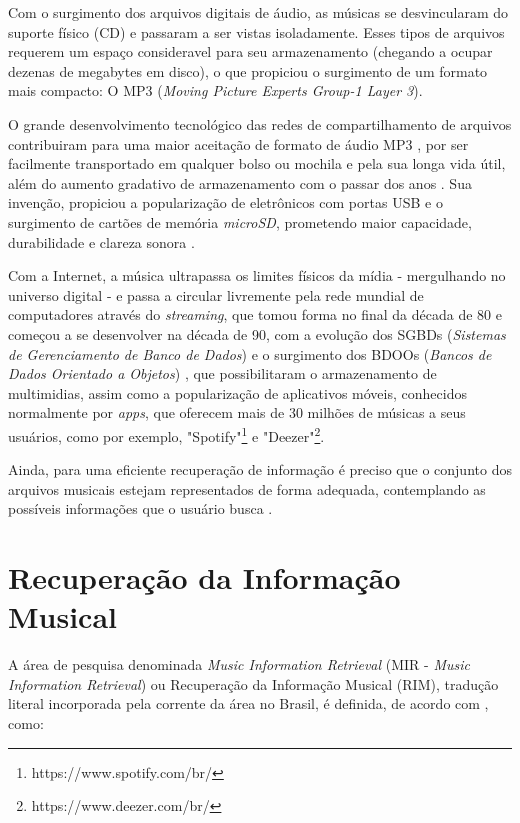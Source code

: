 Com o surgimento dos arquivos digitais de áudio, as músicas se desvincularam do suporte físico (CD) e passaram a ser vistas isoladamente. Esses tipos de arquivos requerem um espaço consideravel para seu armazenamento (chegando a ocupar dezenas de megabytes em disco), o que propiciou o surgimento de um formato mais compacto: O MP3 (\textit{Moving Picture Experts Group-1 Layer 3}).

O grande desenvolvimento tecnológico das redes de compartilhamento de arquivos contribuiram para uma maior aceitação de formato de áudio MP3 \cite{andrade&crispim2008}, por ser facilmente transportado em qualquer bolso ou mochila e pela sua longa vida útil, além do aumento gradativo de armazenamento com o passar dos anos \cite{marchi2005}. Sua invenção, propiciou a popularização de eletrônicos com portas USB e o surgimento de cartões de memória \textit{microSD}, prometendo maior capacidade, durabilidade e clareza sonora \cite{marchi2005}.

Com a Internet, a música ultrapassa os limites físicos da mídia - mergulhando no universo digital - e passa a circular livremente pela rede mundial de computadores através do \textit{streaming}, que tomou forma no final da década de 80 e começou a se desenvolver na década de 90, com a evolução dos SGBDs  (\textit{Sistemas de Gerenciamento de Banco de Dados}) e o surgimento dos BDOOs (\textit{Bancos de Dados Orientado a Objetos}) \cite{junior&segundo2008}, que possibilitaram o armazenamento de multimidias, assim como a popularização de aplicativos móveis, conhecidos normalmente por \textit{apps}, que oferecem mais de 30 milhões de músicas a seus usuários, como por exemplo, "Spotify"\footnote{https://www.spotify.com/br/} e "Deezer"\footnote{https://www.deezer.com/br/}.

Ainda, para uma eficiente recuperação de informação é preciso que o conjunto dos arquivos musicais estejam representados de forma adequada, contemplando as possíveis informações que o usuário busca \cite{ferreira2015}.

\section{Recuperação da Informação Musical} \label{sec:recuperacao}

A área de pesquisa denominada \textit{Music Information Retrieval} (MIR - \textit{Music Information Retrieval}) ou Recuperação da Informação Musical (RIM), tradução literal incorporada pela corrente da área no Brasil, é definida, de acordo com , como:

